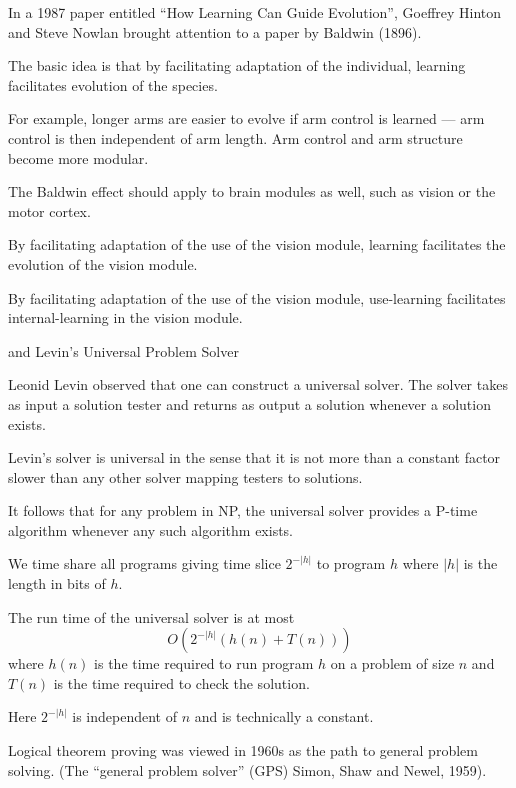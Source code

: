{In a 1987 paper entitled ``How Learning Can Guide Evolution'', Goeffrey Hinton and Steve Nowlan brought attention to a paper by Baldwin (1896).

\vfill
The basic idea is that by facilitating adaptation of the individual, learning facilitates evolution of the species.

\vfill
For example, longer arms are easier to evolve if arm control is learned --- arm control is then independent of arm length.  Arm control and arm structure become more modular.


The Baldwin effect should apply to brain modules as well, such as vision or the motor cortex.

\vfill
By facilitating adaptation of the use of the vision module, learning facilitates the evolution of the vision module.

\vfill
By facilitating adaptation of the use of the vision module, use-learning facilitates internal-learning in the vision module.

{and Levin's Universal Problem Solver}

Leonid Levin observed that one can construct a universal solver.  The solver takes as input a solution tester
and returns as output a solution whenever a solution exists.

  \vfill
Levin's solver is universal in the sense that it is not more than a constant factor slower than any other solver mapping testers to solutions.

\vfill
It follows that for any problem in NP, the universal solver provides a P-time algorithm whenever any such algorithm exists.


  
\vfill
We time share all programs giving time slice $2^{-|h|}$ to program $h$ where $|h|$
is the length in bits of $h$.

\vfill
The run time of the universal solver is at most
$$O(2^{-|h|}(h(n) + T(n)))$$
where $h(n)$ is the time required to run program $h$ on a problem of size $n$ and $T(n)$ is the time required to check the solution.

\vfill
Here $2^{-|h|}$ is independent of $n$ and is technically a constant.


Logical theorem proving was viewed in 1960s as the path to general problem solving. (The ``general problem solver'' (GPS) Simon, Shaw and Newel, 1959).

}
